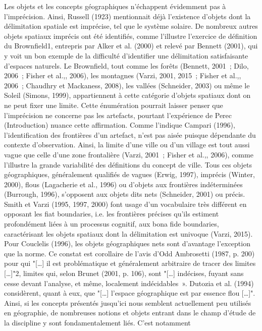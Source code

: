 Les objets et les concepts géographiques n’échappent évidemment pas à
l’imprécision. Ainsi, Russell (1923) mentionnait déjà l’existence
d’objets dont la délimitation spatiale est imprécise, tel que le
système solaire. De nombreux autres objets spatiaux imprécis ont été
identifiés, comme l’illustre l’exercice de définition du Brownfield1,
entrepris par Alker et al. (2000) et relevé par Bennett (2001), qui y
voit un bon exemple de la difficulté d’identifier une délimitation
satisfaisante d’espaces naturels. Le Brownfield, tout comme les forêts
(Bennett, 2001 ; Dilo, 2006 ; Fisher et al.,, 2006), les montagnes
(Varzi, 2001, 2015 ; Fisher et al.,, 2006 ; Chaudhry et Mackaness,
2008), les vallées (Schneider, 2003) ou même le Soleil (Simons, 1999),
appartiennent à cette catégorie d’objets spatiaux dont on ne peut
fixer une limite. Cette énumération pourrait laisser penser que
l’imprécision ne concerne pas les artefacts, pourtant l’expérience de
Perec (Introduction) nuance cette affirmation. Comme l’indique Campari
(1996), l’identification des frontières d’un artefact, n’est pas aisée
puisque dépendante du contexte d’observation. Ainsi, la limite d’une
ville ou d’un village est tout aussi vague que celle d’une zone
frontalière (Varzi, 2001 ; Fisher et al.,, 2006), comme l’illustre la
grande variabilité des définitions du concept de ville.  Tous ces
objets géographiques, généralement qualifiés de vagues (Erwig, 1997),
imprécis (Winter, 2000), flous (Lagacherie et al., 1996) ou d’objets
aux frontières indéterminées (Burrough, 1996), s’opposent aux objets
dits nets (Schneider, 2001) ou précis. Smith et Varzi (1995, 1997,
2000) font usage d’un vocabulaire très différent en opposant les fiat
boundaries, i.e. les frontières précises qu’ils estiment profondément
liées à un processus cognitif, aux bona fide boundaries, caractérisant
les objets spatiaux dont la délimitation est univoque (Varzi,
2015). Pour Couclelis (1996), les objets géographiques nets sont
d’avantage l’exception que la norme. Ce constat est corollaire de
l’avis d’Odd Ambrosetti (1987, p. 200) pour qui "[…] il est
problématique et généralement arbitraire de tracer des limites […]"2,
limites qui, selon Brunet (2001, p. 106), sont "[…] indécises, fuyant
sans cesse devant l’analyse, et même, localement
indécidables ». Dutozia et al. (1994) considèrent, quant à eux, que
"[…] l’espace géographique est par essence flou […]".  Ainsi, si les
concepts présentés jusqu’ici nous semblent actuellement peu utilisés
en géographie, de nombreuses notions et objets entrant dans le champ
d’étude de la discipline y sont fondamentalement liés. C’est notamment
